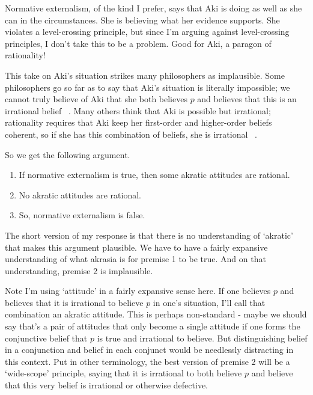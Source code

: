 Normative externalism, of the kind I prefer, says that \gls{Aki} is doing as well as she can in the circumstances. She is believing what her evidence supports. She violates a level-crossing principle, but since I'm arguing against level-crossing principles, I don't take this to be a problem. Good for \gls{Aki}, a paragon of rationality!

This take on \gls{Aki}'s situation strikes many philosophers as implausible. Some philosophers go so far as to say that \gls{Aki}'s situation is literally impossible; we cannot truly believe of \gls{Aki} that she both believes $p$ and believes that this is an irrational belief ~\citep{Hurley1989, Owens2002, Adler2002}. Many others think that \gls{Aki} is possible but irrational; rationality requires that \gls{Aki} keep her first-order and higher-order beliefs coherent, so if she has this combination of beliefs, she is irrational ~\citep{Hookway2001, Ribeiro2011, Smithies2012, Greco2014, Horowitz2014, Titelbaum2015, Littlejohn2015}.

So we get the following argument.

\begin{enumerate}
\item{} If normative externalism is true, then some akratic attitudes are rational.

\item{} No akratic attitudes are rational.

\item{} So, normative externalism is false.

\end{enumerate}
The short version of my response is that there is no understanding of `akratic' that makes this argument plausible. We have to have a fairly expansive understanding of what akrasia is for premise 1 to be true. And on that understanding, premise 2 is implausible.

Note I'm using `attitude' in a fairly expansive sense here. If one believes $p$ and believes that it is irrational to believe $p$ in one's situation, I'll call that combination an akratic attitude. This is perhaps non-standard - maybe we should say that's a pair of attitudes that only become a single attitude if one forms the conjunctive belief that $p$ is true and irrational to believe. But distinguishing belief in a conjunction and belief in each conjunct would be needlessly distracting in this context. Put in other terminology, the best version of premise 2 will be a `wide-scope' principle, saying that it is irrational to both believe $p$ and believe that this very belief is irrational or otherwise defective.

